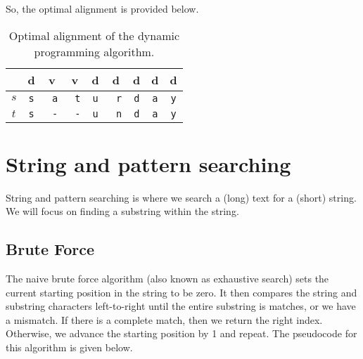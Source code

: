 \documentclass[a4paper, openany]{memoir}
\begin{document}
\noindent So, the optimal alignment is provided below.
\begin{table}[H]
    \centering
    \begin{tabular}{|c|cccccccc|}
        \hline
        & d & v & v & d & d & d & d & d \\
        \hline
        $s$ & \texttt{s} & \texttt{{}\color{red} a} & \texttt{\color{red} t} & \texttt{u} & \texttt{\color{red} r} & \texttt{d} & \texttt{a} & \texttt{y} \\
        $t$ & \texttt{s} & \texttt{\color{red} -} & \texttt{\color{red} -} & \texttt{u} & \texttt{\color{red} n} & \texttt{d} &\texttt{a} &\texttt{y} \\
        \hline
    \end{tabular}
    \caption{Optimal alignment of the dynamic programming algorithm.}
\end{table}
\newpage

\section{String and pattern searching}
String and pattern searching is where we search a (long) text for a (short) string. We will focus on finding a substring within the string.

\subsection{Brute Force}
The naive brute force algorithm (also known as exhaustive search) sets the current starting position in the string to be zero. It then compares the string and substring characters left-to-right until the entire substring is matches, or we have a mismatch. If there is a complete match, then we return the right index. Otherwise, we advance the starting position by 1 and repeat. The pseudocode for this algorithm is given below.

\end{document}
